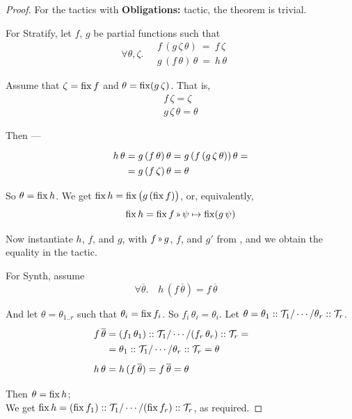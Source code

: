 \begin{proof}
For the tactics with {\bf Obligations:} tactic, the theorem is trivial.

\medskip
For Stratify, let $f$, $g$ be partial functions such that
\[\renewcommand\arraystretch{1.3}
  \forall \theta,\zeta.\quad \begin{array}{l}f\,(g\,\zeta\,\theta) ~=~ f\,\zeta \\
  g\,(f\,\theta)\,\theta ~=~ h\,\theta
  \end{array}\quad\]
  
Assume that $\zeta = \operatorname{fix} f$ and $\theta = \operatorname{fix} (g\,\zeta)$. That is,
\[\renewcommand\arraystretch{1.3}
  \begin{array}{l}
    f\,\zeta = \zeta\\
    g\,\zeta\,\theta = \theta
  \end{array}\]
  
Then ---
\[\renewcommand\arraystretch{1.3}
  \begin{array}{l@{}l}
   h\,\theta & {}= g\,(f\,\theta)\,\theta = g\,(f\,(g\,\zeta\,\theta))\,\theta = \\
             & {}= g\,(f\,\zeta)\,\theta = \theta
  \end{array}\]
  
So $\theta = \operatorname{fix} h$. We get $\operatorname{fix} h = \operatorname{fix} \big(g \,(\operatorname{fix} f)\big)$, or, equivalently,
\[\fix h = \fix f \applt \psi\mapsto\fix (g\,\psi)\]

Now instantiate $h$, $f$, and $g$, with $f\applt g$, $f$, and $g'$ from ,
and we obtain the equality in the tactic.

\medskip
For Synth, assume
\[\renewcommand\arraystretch{1.3}
  \forall \overline\theta.\quad h\,(f\,\overline\theta)=f\,\overline\theta \quad\]

And let $\theta=\theta_{1..r}$ such that $\theta_i=\operatorname{fix} f_i$. So $f_i\,\theta_i=\theta_i$.
Let $\theta=\theta_1::\mathcal{T}_1/\cdots/\theta_r::\mathcal{T}_r$.
\[\renewcommand\arraystretch{1.3}
  \begin{array}{l@{}l}
   f\,\overline\theta & {}= (f_1\,\theta_1)::\T_1 / \cdots / (f_r\,\theta_r)::\T_r =  \\
     & {}= \theta_1::\T_1 / \cdots / \theta_r::\T_r = \theta \\[.5em]
   h\,\theta & {}= h\,(f\,\overline\theta) = f\,\overline\theta = \theta
   \end{array}\qquad\]
   
Then $\theta=\operatorname{fix} h$;\\
We get $\operatorname{fix} h = (\operatorname{fix} f_1)::\mathcal{T}_1 / \cdots / (\operatorname{fix} f_r)::\mathcal{T}_r$,
as required.
\end{proof}
